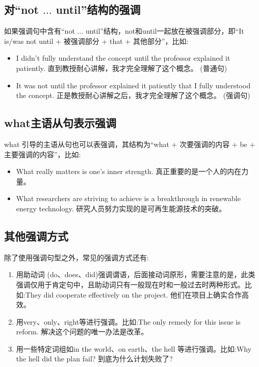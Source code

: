 \subsection{对“not \(\ldots\) until”结构的强调}

如果强调句中含有“not \(\ldots\) until”结构，not和until一起放在被强调部分，即“It is/was not until + 被强调部分 + that + 其他部分”，比如:
\begin{itemize}
  \item I didn't fully understand the concept until the professor explained it patiently. 直到教授耐心讲解，我才完全理解了这个概念。 (普通句)
  \item It was not until the professor explained it patiently that I fully understood the concept. 正是教授耐心讲解之后，我才完全理解了这个概念。 (强调句)
\end{itemize}

\subsection{what主语从句表示强调}

what 引导的主语从句也可以表强调，其结构为“what + 次要强调的内容 + be + 主要强调的内容”，比如:
\begin{itemize}
  \item What really matters is one's inner strength. 真正重要的是一个人的内在力量。
  \item What researchers are striving to achieve is a breakthrough in renewable energy technology. 研究人员努力实现的是可再生能源技术的突破。
\end{itemize}

\subsection{其他强调方式}

除了使用强调句型之外，常见的强调方式还有:
\begin{enumerate}
  \item 用助动词 (do、does、did)强调谓语，后面接动词原形，需要注意的是，此类强调仅用于肯定句中，且助动词只有一般现在时和一般过去时两种形式。比如:They did cooperate effectively on the project. 他们在项目上确实合作高效。
  \item 用very、only、right等进行强调。比如:The only remedy for this issue is reform. 解决这个问题的唯一办法是改革。
  \item 用一些特定词组如in the world、on earth、the hell 等进行强调。比如:Why the hell did the plan fail? 到底为什么计划失败了?
\end{enumerate}




